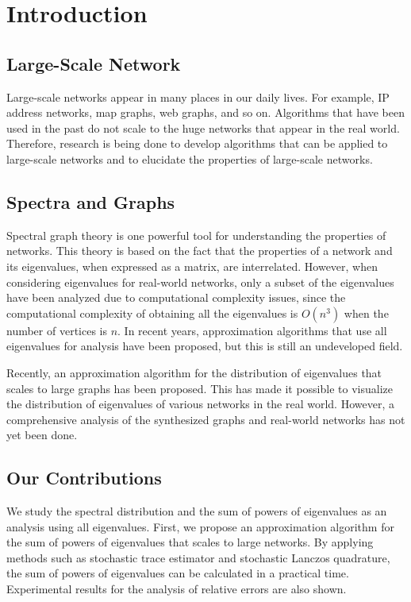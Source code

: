 \documentclass[senior,final,11pt]{iscs-thesis}
\begin{document}
\frontmatter %
\tableofcontents %
\mainmatter %

\chapter{Introduction}
\section{Large-Scale Network}
Large-scale networks appear in many places in our daily lives. For example, IP address networks, map graphs, web graphs, and so on. Algorithms that have been used in the past do not scale to the huge networks that appear in the real world. Therefore, research is being done to develop algorithms that can be applied to large-scale networks and to elucidate the properties of large-scale networks.

\section{Spectra and Graphs}
Spectral graph theory is one powerful tool for understanding the properties of networks. This theory is based on the fact that the properties of a network and its eigenvalues, when expressed as a matrix, are interrelated. However, when considering eigenvalues for real-world networks, only a subset of the eigenvalues have been analyzed due to computational complexity issues, since the computational complexity of obtaining all the eigenvalues is $O(n^3)$ when the number of vertices is $n$. In recent years, approximation algorithms that use all eigenvalues for analysis have been proposed, but this is still an undeveloped field.

Recently, an approximation algorithm for the distribution of eigenvalues that scales to large graphs has been proposed. This has made it possible to visualize the distribution of eigenvalues of various networks in the real world. However, a comprehensive analysis of the synthesized graphs and real-world networks has not yet been done.

\section{Our Contributions}
We study the spectral distribution and the sum of powers of eigenvalues as an analysis using all eigenvalues. First, we propose an approximation algorithm for the sum of powers of eigenvalues that scales to large networks. By applying methods such as stochastic trace estimator and stochastic Lanczos quadrature, the sum of powers of eigenvalues can be calculated in a practical time. Experimental results for the analysis of relative errors are also shown.
\end{document}
